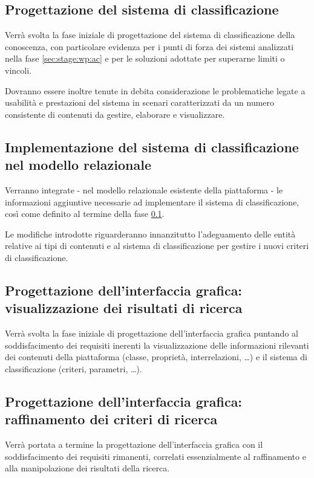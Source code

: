 \documentclass[10pt,a4paper,hidelinks]{scrartcl} %
\begin{document}
	\subsection{Progettazione del sistema di classificazione}
	\label{sec:stage:wp:design}
	Verrà svolta la fase iniziale di progettazione del sistema di classificazione della conoscenza, con particolare evidenza per i punti di forza dei sistemi analizzati nella fase \ref{sec:stage:wp:ac} e per le soluzioni adottate per superarne limiti o vincoli.

	Dovranno essere inoltre tenute in debita considerazione le problematiche legate a usabilità e prestazioni del sistema in scenari caratterizzati da un numero consistente di contenuti da gestire, elaborare e visualizzare.
	
	\subsection{Implementazione del sistema di classificazione nel modello relazionale}
	\label{sec:stage:wp:build}
	Verranno integrate - nel modello relazionale esistente della piattaforma - le informazioni aggiuntive necessarie ad implementare il sistema di classificazione, così come definito al termine della fase \ref{sec:stage:wp:design}.

	Le modifiche introdotte riguarderanno innanzitutto l'adeguamento delle entità relative ai tipi di contenuti e al sistema di classificazione per gestire i nuovi criteri di classificazione.

	\subsection{Progettazione dell'interfaccia grafica: visualizzazione dei risultati di ricerca}
	\label{sec:stage:wp:ui:design}
	Verrà svolta la fase iniziale di progettazione dell'interfaccia grafica puntando al soddisfacimento dei requisiti inerenti la visualizzazione delle informazioni rilevanti dei contenuti della piattaforma (classe, proprietà, interrelazioni, \ldots) e il sistema di classificazione (criteri, parametri, \ldots).

	\subsection{Progettazione dell'interfaccia grafica: raffinamento dei criteri di ricerca}
	\label{sec:stage:wp:ui:advanced-design}
	Verrà portata a termine la progettazione dell'interfaccia grafica con il soddisfacimento dei requisiti rimanenti, correlati essenzialmente al raffinamento e alla manipolazione dei risultati della ricerca.
\end{document}

